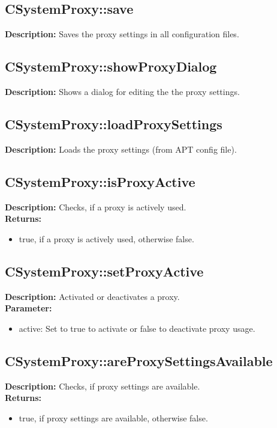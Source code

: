 \subsection{CSystemProxy::save}
\textbf{Description:} Saves the proxy settings in all configuration files.\\

\subsection{CSystemProxy::showProxyDialog}
\textbf{Description:} Shows a dialog for editing the the proxy settings.\\

\subsection{CSystemProxy::loadProxySettings}
\textbf{Description:} Loads the proxy settings (from APT config file).\\

\subsection{CSystemProxy::isProxyActive}
\textbf{Description:} Checks, if a proxy is actively used.\\
\textbf{Returns:}
\begin{itemize}
\item true, if a proxy is actively used, otherwise false.
\end{itemize}

\subsection{CSystemProxy::setProxyActive}
\textbf{Description:} Activated or deactivates a proxy.\\
\textbf{Parameter:}
\begin{itemize}
\item active: Set to true to activate or false to deactivate proxy usage.
\end{itemize}

\subsection{CSystemProxy::areProxySettingsAvailable}
\textbf{Description:} Checks, if proxy settings are available.\\
\textbf{Returns:}
\begin{itemize}
\item true, if proxy settings are available, otherwise false.
\end{itemize}

